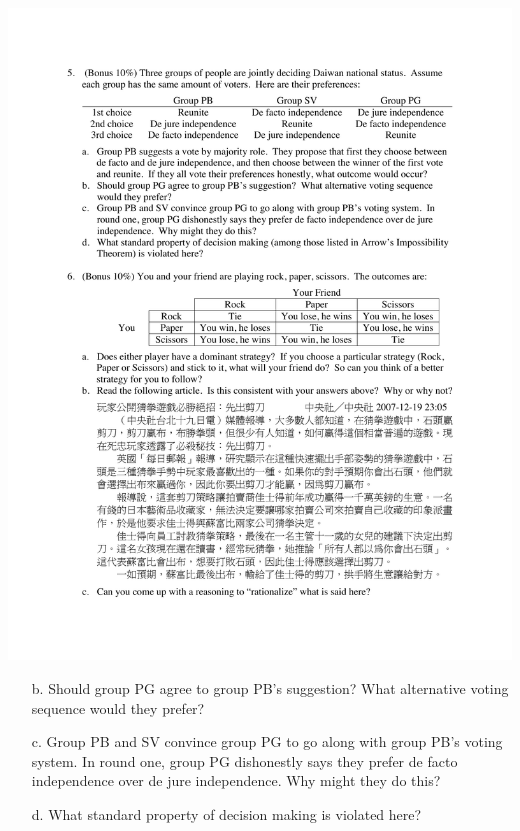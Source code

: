 \documentclass[12pt, xcolor=dvipsnames]{beamer}
\begin{document}
\begin{frame}
\small 
\begin{center}
\includegraphics[width=.9\linewidth]{figures/q5.pdf}
\end{center}
\begin{enumerate}\itemsep-0.5ex 
\item[b.] Should group PG agree to group PB's suggestion? What alternative voting sequence would they prefer?
\item[c.] Group PB and SV convince group PG to go along with group PB’s voting system. In round one, group PG dishonestly says they prefer de facto independence over de jure independence. Why might they do this?
\item[d.] What standard property of decision making is violated here? 
\end{enumerate}
\end{frame}
\end{document}
